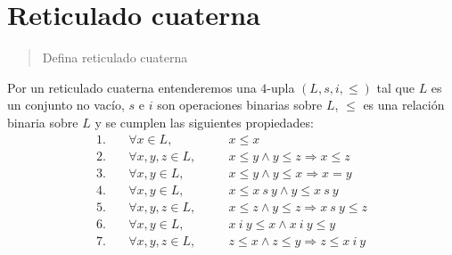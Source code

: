 \documentclass{article}
\begin{document}
\section{Reticulado cuaterna}
\begin{quote}
  Defina reticulado cuaterna
\end{quote}
Por un reticulado cuaterna entenderemos una $4$-upla $(L,s,i,\leq)$ tal que $L$ es un conjunto no vacío, $s$ e $i$ son operaciones binarias sobre $L$, $\leq$ es una relación binaria sobre $L$ y se cumplen las siguientes propiedades:
\begin{equation*}
  \begin{alignedat}{2}
    1. & \quad \forall x\in L,     &  & \quad x\leq x                                       \\
    2. & \quad \forall x,y,z\in L, &  & \quad x\leq y\land y\leq z\Rightarrow x\leq z       \\
    3. & \quad \forall x,y\in L,   &  & \quad x\leq y\land y\leq x\Rightarrow x=y           \\
    4. & \quad \forall x,y\in L,   &  & \quad x\leq x\ s\ y\land y\leq x\ s\ y              \\
    5. & \quad \forall x,y,z\in L, &  & \quad x\leq z\land y\leq z\Rightarrow x\ s\ y\leq z \\
    6. & \quad \forall x,y\in L,   &  & \quad x\ i\ y\leq x\land x\ i\ y\leq y              \\
    7. & \quad \forall x,y,z\in L, &  & \quad z\leq x\land z\leq y\Rightarrow z\leq x\ i\ y
  \end{alignedat}
\end{equation*}
\end{document}
